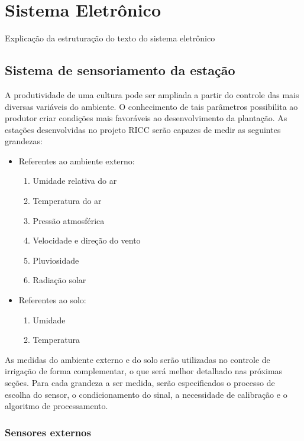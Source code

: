 \chapter[Sistema Eletrônico]{Sistema Eletrônico}

Explicação da estruturação do texto do sistema eletrônico

\section{Sistema de sensoriamento da estação}

	A produtividade de uma cultura pode ser ampliada a partir do controle das mais diversas variáveis do ambiente. O conhecimento de tais parâmetros possibilita ao produtor criar condições mais favoráveis ao desenvolvimento da plantação. As estações desenvolvidas no projeto RICC serão capazes de medir as seguintes grandezas:

	\begin{itemize}
		\item Referentes ao ambiente externo:
		\begin{enumerate}
			\item Umidade relativa do ar
			\item Temperatura do ar
			\item Pressão atmosférica
			\item Velocidade e direção do vento
			\item Pluviosidade
			\item Radiação solar
		\end{enumerate}	 		
	
		\item Referentes ao solo:	
		\begin{enumerate}
			\item Umidade
			\item Temperatura
		\end{enumerate}	
	\end{itemize}

	As medidas do ambiente externo e do solo serão utilizadas no controle de irrigação de forma complementar, o que será melhor detalhado nas próximas seções. Para cada grandeza a ser medida, serão especificados o processo de escolha do sensor, o condicionamento do sinal, a necessidade de calibração e o algoritmo de processamento. 

	\subsection{Sensores externos}

